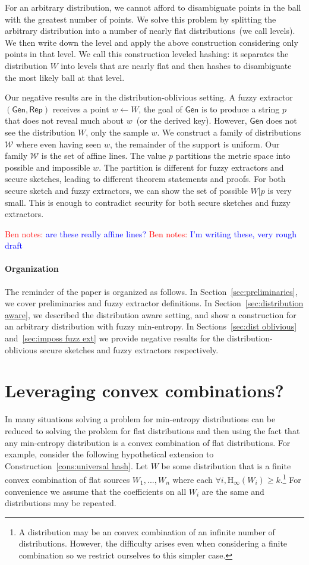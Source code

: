 \documentclass[11pt]{article}
\newcommand{\secref}[1]{\mbox{Section~\ref{#1}}}
\newcommand{\consref}[1]{\mbox{Construction~\ref{#1}}}
\newcommand{\class}[1]{{\ensuremath{\mathsf{#1}}}}
\newcommand{\gen}{\ensuremath{\class{Gen}}\xspace}
\newcommand{\rep}{\ensuremath{\class{Rep}}\xspace}
\newcommand{\Hoo}{\mathrm{H}_\infty}
\newcommand{\authnote}[2]{{\textcolor{red}{\textsf{#1 notes: }\textcolor{blue}{ #2}}\marginpar{\textcolor{red}{\textbf{!!!!!}}}}}
\newcommand{\authnote}[2]{}
\newcommand{\bnote}[1]{{\authnote{Ben}{#1}}}
\begin{document}
For an arbitrary distribution, we cannot afford to disambiguate points in the ball with the greatest number of points.  We solve this problem by splitting the arbitrary distribution into a number of nearly flat distributions~(we call levels).  We then write down the level and apply the above construction considering only points in that level.  We call this construction leveled hashing: it separates the distribution $W$ into levels that are nearly flat and then hashes to disambiguate the most likely ball at that level.

Our negative results are in the distribution-oblivious setting.  A fuzzy extractor $(\gen, \rep)$ receives a point $w\leftarrow W$, the goal of $\gen$ is to produce a string $p$ that does not reveal much about $w$~(or the derived key).  However, $\gen$ does not see the distribution $W$, only the sample $w$.  We construct a family of distributions $\mathcal{W}$ where even having seen $w$, the remainder of the support is uniform.  Our family $\mathcal{W}$ is the set of affine lines.  The value  $p$ partitions the metric space into possible and impossible $w$.  The partition is different for fuzzy extractors and secure sketches, leading to different theorem statements and proofs.  For both secure sketch and fuzzy extractors, we can show the set of possible $W|p$ is very small.  This is enough to contradict security for both secure sketches and fuzzy extractors.

\bnote{are these really affine lines?}
\bnote{I'm writing these, very rough draft}

\paragraph{Organization} The reminder of the paper is organized as follows.  In \secref{sec:preliminaries}, we cover preliminaries and fuzzy extractor definitions.  In \secref{sec:distribution aware}, we described the distribution aware setting, and show a construction for an arbitrary distribution with fuzzy min-entropy.  In Sections~\ref{sec:dist oblivious} and~\ref{sec:imposs fuzz ext} we provide negative results for the distribution-oblivious secure sketches and fuzzy extractors respectively.
\section{Leveraging convex combinations?}
\label{sec:convex comb}
In many situations solving a problem for min-entropy distributions can be reduced to solving the problem for flat distributions and then using the fact that any min-entropy distribution is a convex combination of flat distributions.  For example, consider the following hypothetical extension to \consref{cons:universal hash}.  Let $W$ be some distribution that is a finite convex combination of flat sources $W_1,..., W_n$ where each $\forall i, \Hoo(W_i)\ge k$.\footnote{A distribution may be an  convex combination of an infinite number of distributions.  However, the difficulty arises even when considering a finite combination so we restrict ourselves to this simpler case.}  For convenience we assume that the coefficients on all $W_i$ are the same and distributions may be repeated. 
\end{document}
